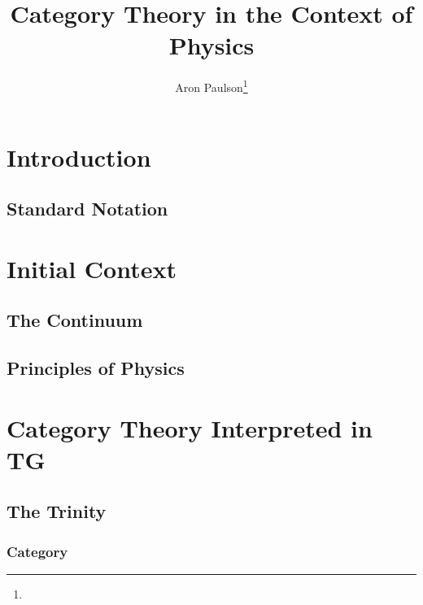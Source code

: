\documentclass[a4paper,11pt,psamsfonts,reqno]{amsbook}
\newcounter{prpcounter}
\theoremstyle{proposition}
\theoremstyle{proof}
\begin{document}
\title{Category Theory in the Context of Physics}
\author{Aron Paulson\footnote{\datename{ \today}}}
\maketitle
\tableofcontents







\chapter{Introduction}
\label{chap:intro}



\section{Standard Notation}
\label{sec:notation}




\chapter{Initial Context}
\label{chap:initcontext}



\section{The Continuum}
\label{sec:continuum}



\section{Principles of Physics}
\label{sec:princphy}




\chapter{Category Theory Interpreted in TG}
\label{chap:cattg}



\section{The Trinity}
\label{sec:trinity}


\subsection{Category}
\label{sec:cat}

\end{document}
